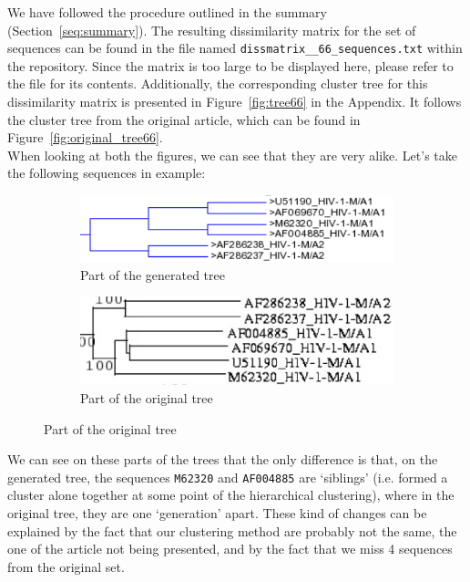 \documentclass[english,13pt,a4paper]{article}
\theoremstyle{definition}
\theoremstyle{remark}
\theoremstyle{defstyle}
\begin{document}
We have followed the procedure outlined in the summary (Section~\ref{seq:summary}). The resulting dissimilarity matrix for the set of sequences can be found in the file named \texttt{dissmatrix\_\_66\_sequences.txt} within the repository. Since the matrix is too large to be displayed here, please refer to the file for its contents. Additionally, the corresponding cluster tree for this dissimilarity matrix is presented in Figure~\ref{fig:tree66} in the Appendix. It follows the cluster tree from the original article, which can be found in Figure~\ref{fig:original_tree66}.\\

When looking at both the figures, we can see that they are very alike. Let's take the following sequences in example:

\begin{figure}[H]
    \centering
    \begin{subfigure}{0.48\textwidth}
        \centering
        \includegraphics[width=\textwidth]{Images/Example_66.png}
        \caption{Part of the generated tree}
    \end{subfigure}
    \hfill
    \begin{subfigure}{0.48\textwidth}
        \centering
        \includegraphics[width=\textwidth]{Images/Example_Orig66.png}
        \caption{Part of the original tree}
    \end{subfigure}
\end{figure}

We can see on these parts of the trees that the only difference is that, on the generated tree, the sequences \texttt{M62320} and \texttt{AF004885} are `siblings' (i.e. formed a cluster alone together at some point of the hierarchical clustering), where in the original tree, they are one `generation' apart. These kind of changes can be explained by the fact that our clustering method are probably not the same, the one of the article not being presented, and by the fact that we miss 4 sequences from the original set.\\
\end{document}
